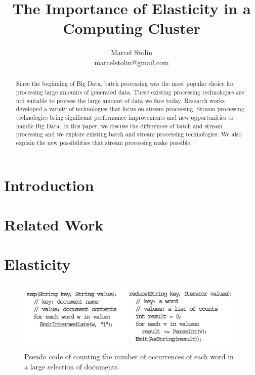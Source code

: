 \documentclass{article}
\title{The Importance of Elasticity in a Computing Cluster}
\date{}
\author{Marcel Stolin \\ marcelstolin@gmail.com}
\begin{document}
\maketitle


\begin{abstract}
Since the beginning of Big Data, batch processing was the most popular choice for processing large amounts of generated data. These existing processing technologies are not suitable to process the large amount of data we face today. Research works developed a variety of technologies that focus on stream processing. Stream processing technologies bring significant performance improvements and new opportunities to handle Big Data. In this paper, we discuss the differences of batch and stream processing and we explore existing batch and stream processing technologies. We also explain the new possibilities that stream processing make possible.
\end{abstract}


\section{Introduction} \label{s_intro}


\section{Related Work} \label{s_related}


\section{Elasticity} \label{s_batch}

\begin{figure}[h!]
  \includegraphics[width=\linewidth]{images/mapreduce.jpg}
  \caption{Pseudo code of counting the number of occurrences of each word in a large selection of documents.}
  \label{fig:mapreduce}
\end{figure}
\end{document}
